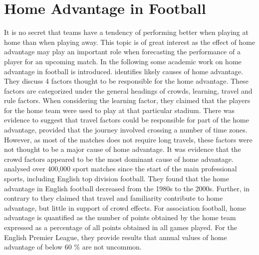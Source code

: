 \section{Home Advantage in Football}\label{HomeFieldAdvantage}
It is no secret that teams have a tendency of performing better when playing at home than when playing away. This topic is of great interest as the effect of home advantage may play an important role when forecasting the performance of a player for an upcoming match. In the following some academic work on home advantage in football is introduced.
\newpar
\cite{Nevill} identifies likely causes of home advantage. They discuss 4 factors thought to be responsible for the home advantage. These factors are categorized under the general headings of crowds, learning, travel and rule factors. When considering the learning factor, they claimed that the players for the home team were used to play at that particular stadium. There was evidence to suggest that travel factors could be responsible for part of the home advantage, provided that the journey involved crossing a number of time zones. However, as most of the matches does not require long travels, these factors were not thought to be a major cause of home advantage. It was evidence that the crowd factors appeared to be the most dominant cause of home advantage.
\newpar
\cite{Pollard} analysed over 400,000 sport matches since the start of the main professional sports, including English top division football. They found that the home advantage in English football decreased from the 1980s to the 2000s. Further, in contrary to \cite{Nevill} they claimed that travel and familiarity contribute to home advantage, but little in support of crowd effects. For association football, \cite{Pollard} home advantage is quantified as the number of points obtained by the home team expressed as a percentage of all points obtained in all games played. For the English Premier League, they provide results that annual values of home advantage of below 60 \% are not uncommon. 
\newpar







